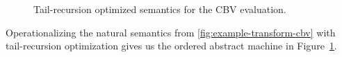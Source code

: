 \begin{figure}
\caption{Tail-recursion optimized semantics for the CBV
  evaluation.}
\label{fig:cbv-ev-ssos-tail}
\end{figure}

Operationalizing the natural semantics from
\ref{fig:example-transform-cbv} with tail-recursion optimization gives
us the ordered abstract machine in Figure~\ref{fig:cbv-ev-ssos-tail}.






